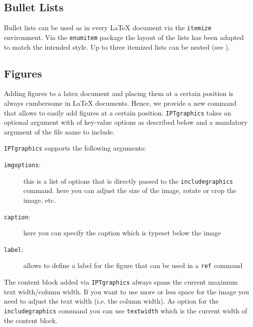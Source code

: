 
\subsection{Bullet Lists}

Bullet lists can be used as in every \LaTeX{} document via the \texttt{itemize} environment. Via the \texttt{enumitem} package the layout of the lists has been adapted to match the intended style. Up to three itemized lists can be nested (see ).



\subsection{Figures}

Adding figures to a latex document and placing them at a certain position is always cumbersome in \LaTeX{} documents. Hence, we provide a new command \texttt{} that allows to easily add figures at a certain position. 
\texttt{IPTgraphics} takes an optional argument with of key-value options as described below and a mandatory argument of the file name to include.

\texttt{IPTgraphics} supports the following arguments:
\begin{description}
	\item[\texttt{imgoptions}:] this is a list of options that is directly passed to the \texttt{\bs{}includegraphics} command. here you can adjust the size of the image, rotate or crop the image, etc.
	\item[\texttt{caption}:] here you can specify the caption which is typeset below the image
	\item[\texttt{label}:] allows to define a label for the figure that can be used in a \texttt{\bs{}ref} command
\end{description}

The content block added via \texttt{IPTgraphics} always spans the current maximum text width/column width. If you want to use more or less space for the image you need to adjust the text width (i.e. the column width). As option for the \texttt{includegraphics} command you can use \texttt{\bs{}textwidth} which is the current width of the content block.

